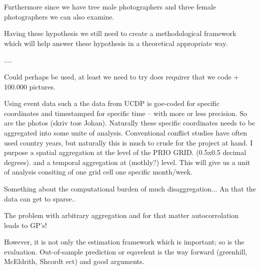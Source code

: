 \documentclass[a4paper]{article}
\begin{document}
Furthermore since we have tree male photographers and three female photographers we can also examine. 

Having these hypothesis we still need to create a methodological framework which will help answer these hypothesis in a theoretical appropriate way.

....

Could perhaps be used, at least we need to try does requirer that we code + 100.000 pictures.

Using event data such a the data from UCDP is goe-coded for specific coordinates and timestamped for specific time -- with more or less precision. So are the photos (skriv toæ Johan). Naturally these specific coordinates needs to be aggregated into some unite of analysis. Conventional conflict studies have often used country years, but naturally this is much to crude for the project at hand. I purpose a spatial aggregation at the level of the PRIO GRID. (0.5x0.5 decimal degrees). and a temporal aggregation at (mothly?) level. This will give us a unit of analysis consiting of one grid cell one specific month/week. 

Something about the computational burden of much disaggregation... An that the data can get to sparse..

The problem with arbitrary aggregation and for that matter autocorrolation leads to GP's!


However, it is not only the estimation framework which is important; so is the evaluation. Out-of-sample prediction or eqavelent is the way forward (greenhill, McEldrith, Shcordt ect) and good arguments.






\end{document}
